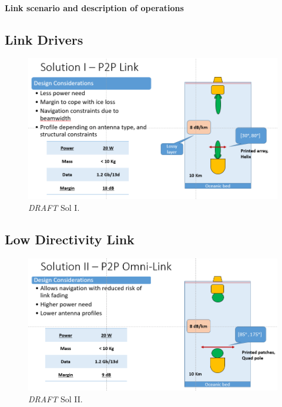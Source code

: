 
\paragraph{Link scenario and description of operations}




\subsection{Link Drivers}





\begin{figure}[htb]
	\centering
	\includegraphics[width=\textwidth]{figures/comms/iceLink-p2p-HighD}
	\caption{ \textit{DRAFT} Sol I.}
	\label{fig:iceLink-p2p-HighD}
\end{figure}

%

\subsection{Low Directivity Link}
\begin{figure}[htb]
	\centering
	\includegraphics[width=\textwidth]{figures/comms/iceLink-p2p-LowD}
	\caption{ \textit{DRAFT} Sol II.}
	\label{fig:iceLink-p2p-LowD}
\end{figure}

